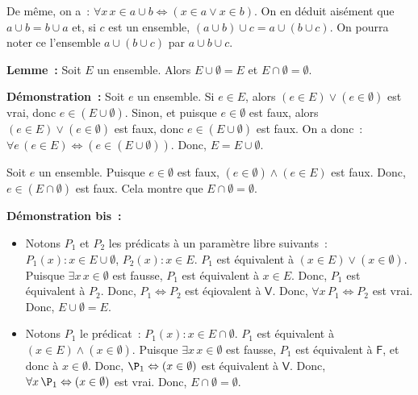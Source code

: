 De même, on a : $\forall x \, x \in a \cup b \Leftrightarrow (x \in a \vee x \in b)$. 
On en déduit aisément que $a \cup b = b \cup a$ et, si $c$ est un ensemble, $(a \cup b) \cup c = a \cup (b \cup c)$. 
On pourra noter ce l'ensemble $a \cup (b \cup c)$ par $a \cup b \cup c$. 

\medskip

\noindent\textbf{Lemme :} Soit $E$ un ensemble. 
    Alors $E \cup \emptyset = E$ et $E \cap \emptyset = \emptyset$.

\medskip

\noindent\textbf{Démonstration :} 
    Soit $e$ un ensemble. 
    Si $e \in E$, alors $(e \in E) \vee (e \in \emptyset)$  est vrai, donc $e \in (E \cup \emptyset)$.
    Sinon, et puisque $e \in \emptyset$ est faux, alors $(e \in E) \vee (e \in \emptyset)$  est faux, donc $e \in (E \cup \emptyset)$ est faux.
    On a donc : $\forall e \, (e \in E) \Leftrightarrow (e \in (E \cup \emptyset))$.
    Donc, $E = E \cup \emptyset$.

    Soit $e$ un ensemble. 
    Puisque $e \in \emptyset$ est faux, $(e \in \emptyset) \wedge (e \in E)$ est faux. 
    Donc, $e \in (E \cap \emptyset)$ est faux.
    Cela montre que $E \cap \emptyset = \emptyset$.

    \done

\medskip

\noindent\textbf{Démonstration bis :} 
    \begin{itemize}[nosep]
        \item Notons $P_1$ et $P_2$ les prédicats à un paramètre libre suivants : $P_1(x): x \in E \cup \emptyset$, $P_2(x): x \in E$. 
            $P_1$ est équivalent à $(x \in E) \vee (x \in \emptyset)$.
            Puisque $\exists x \, x \in \emptyset$ est fausse, $P_1$ est équivalent à $x \in E$.
            Donc, $P_1$ est équivalent à $P_2$.
            Donc, $P_1 \Leftrightarrow P_2$ est éqiovalent à $\mathsf{V}$.
            Donc, $\forall x \, P_1 \Leftrightarrow P_2$ est vrai.
            Donc, $E \cup \emptyset = E$.
        \item Notons $P_1$ le prédicat : $P_1(x): x \in E \cap \emptyset$. 
            $P_1$ est équivalent à $(x \in E) \wedge (x \in \emptyset)$.
            Puisque $\exists x \, x \in \emptyset$ est fausse, $P_1$ est équivalent à $\mathsf{F}$, et donc à $x \in \emptyset$.
            Donc, $\P_1 \Leftrightarrow (x \in \emptyset)$ est équivalent à $\mathsf{V}$.
            Donc, $\forall x \, \P_1 \Leftrightarrow (x \in \emptyset)$ est vrai.
            Donc, $E \cap \emptyset = \emptyset$.
    \end{itemize}

